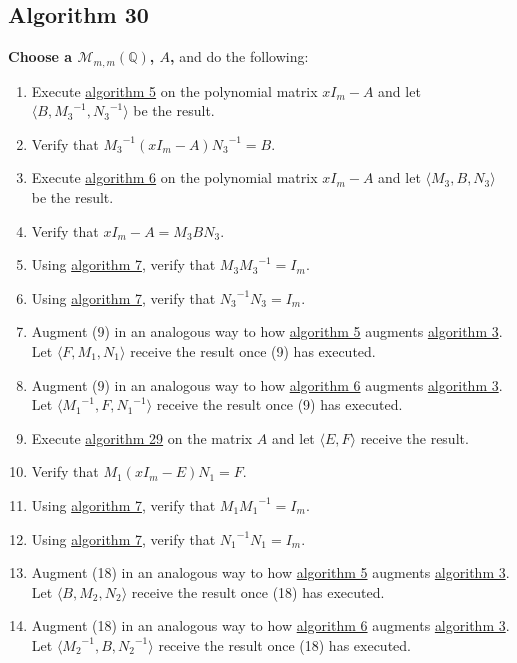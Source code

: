 \documentclass[twocolumn]{article}
\begin{document}
		\subsection{Algorithm 30}\label{sec:algorithm 30}
			\textbf{Choose a $\mathcal{M}_{m,m}(\mathbb{Q})$, $A$,} and do the following:
			\begin{enumerate}
				\item Execute \hyperref[sec:algorithm 5]{algorithm 5} on the polynomial matrix $xI_m-A$ and let $\langle B,{M_3}^{-1},{N_3}^{-1}\rangle$ be the result.
				\item Verify that ${M_3}^{-1}(xI_m-A){N_3}^{-1}=B$.
				\item Execute \hyperref[sec:algorithm 6]{algorithm 6} on the polynomial matrix $xI_m-A$ and let $\langle M_3,B,N_3\rangle$ be the result.
				\item Verify that $xI_m-A=M_3BN_3$.
				\item Using \hyperref[sec:algorithm 7]{algorithm 7}, verify that $M_3{M_3}^{-1}=I_m$.
				\item Using \hyperref[sec:algorithm 7]{algorithm 7}, verify that ${N_3}^{-1}N_3=I_m$.
				\item Augment (9) in an analogous way to how \hyperref[sec:algorithm 5]{algorithm 5} augments \hyperref[sec:algorithm 3]{algorithm 3}. Let $\langle F,M_1,N_1\rangle$ receive the result once (9) has executed.
				\item Augment (9) in an analogous way to how \hyperref[sec:algorithm 6]{algorithm 6} augments \hyperref[sec:algorithm 3]{algorithm 3}. Let $\langle {M_1}^{-1},F,{N_1}^{-1}\rangle$ receive the result once (9) has executed.
				\item Execute \hyperref[sec:algorithm 29]{algorithm 29} on the matrix $A$ and let $\langle E,F\rangle$ receive the result.
				\item Verify that $M_1(xI_m-E)N_1=F$.
				\item Using \hyperref[sec:algorithm 7]{algorithm 7}, verify that $M_1{M_1}^{-1}=I_m$.
				\item Using \hyperref[sec:algorithm 7]{algorithm 7}, verify that ${N_1}^{-1}N_1=I_m$.
				\item Augment (18) in an analogous way to how \hyperref[sec:algorithm 5]{algorithm 5} augments \hyperref[sec:algorithm 3]{algorithm 3}. Let $\langle B,M_2,N_2\rangle$ receive the result once (18) has executed.
				\item Augment (18) in an analogous way to how \hyperref[sec:algorithm 6]{algorithm 6} augments \hyperref[sec:algorithm 3]{algorithm 3}. Let $\langle {M_2}^{-1},B,{N_2}^{-1}\rangle$ receive the result once (18) has executed.

\end{enumerate}
\end{document}
